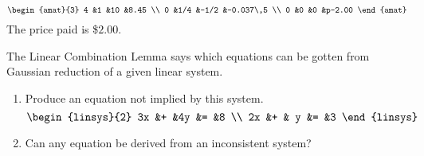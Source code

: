 \begin{exercises}
\begin{answer}
\begin{equation*}
\begin{amat}{3}
         4  &1    &10     &8.45      \\
         0  &1/4  &-1/2   &-0.037\,5 \\
         0  &0    &0      &p-2.00
       \end{amat}
     \end{equation*}
     The price paid is \$$2.00$.
   \end{answer}
  \recommended \item 
   The Linear Combination Lemma says which equations can be gotten from
   Gaussian reduction of a given linear system.
   \begin{enumerate}
     \item Produce an equation not implied by this system.
       \begin{equation*}
         \begin{linsys}{2}
           3x  &+  &4y  &=  &8 \\
           2x  &+  & y  &=  &3 
         \end{linsys}
       \end{equation*}
     \item Can any equation be derived from an inconsistent system?
   \end{enumerate}

\end{exercises}

